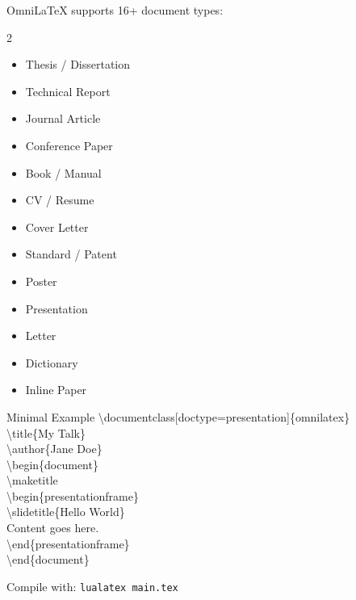 \documentclass[
    language=english,
    doctype=presentation,
    institution=none,
]{../../omnilatex}
\begin{document}

\begin{presentationframe}

    OmniLaTeX supports 16+ document types:

    \begin{multicols}{2}
        \begin{itemize}
            \item Thesis / Dissertation
            \item Technical Report
            \item Journal Article
            \item Conference Paper
            \item Book / Manual
            \item CV / Resume
            \item Cover Letter
            \item Standard / Patent
            \item Poster
            \item Presentation
            \item Letter
            \item Dictionary
            \item Inline Paper
        \end{itemize}
    \end{multicols}
\end{presentationframe}


\begin{presentationframe}

    \begin{presentationblock}{Minimal Example}
        \ttfamily\small
        \textbackslash documentclass[doctype=presentation]\{omnilatex\}\\
        \textbackslash title\{My Talk\}\\
        \textbackslash author\{Jane Doe\}\\
        \textbackslash begin\{document\}\\
        \quad\textbackslash maketitle\\
        \quad\textbackslash begin\{presentationframe\}\\
        \quad\quad\textbackslash slidetitle\{Hello World\}\\
        \quad\quad Content goes here.\\
        \quad\textbackslash end\{presentationframe\}\\
        \textbackslash end\{document\}
    \end{presentationblock}

    \vspace{2mm}
    Compile with: \texttt{lualatex main.tex}
\end{presentationframe}
\end{document}
